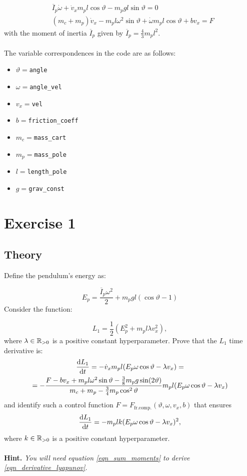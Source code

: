 \documentclass[12pt]{article}
\begin{document}
\begin{eqnarray}
\label{eqn_sum_moments}
& \overline{I}_p \dot{\omega} + \dot{v}_x m_p l\cos \vartheta  - m_p g l \sin \vartheta = 0 \\ 
\label{eqn_2nd_newton_law}
& (m_c + m_p) \dot{v}_x - m_p l \omega^2 \sin \vartheta + \dot{\omega} m_p l \cos \vartheta  + b v_x = F
\end{eqnarray}
with the moment of inertia $\overline{I}_p$ given by $\overline{I}_p  = \frac{4}{3}m_p l ^ 2 $.
\\
\\
The variable correspondences in the code are as follows:
\begin{itemize}
    \item $\vartheta=$\texttt{angle}
    \item $\omega=$\texttt{angle\_vel}
    \item $v_x=$\texttt{vel}
    \item $b=$\texttt{friction\_coeff} 
    \item $m_c=$\texttt{mass\_cart}
    \item $m_p=$\texttt{mass\_pole}
    \item $l=$\texttt{length\_pole}
    \item $g=$\texttt{grav\_const}
\end{itemize}
\section*{Exercise 1}
\subsection*{Theory}
Define the pendulum's energy as:

$$
E_p =  \frac{\overline{I}_p \omega ^ 2}{2}   + m_p g l (\cos{\vartheta} - 1)
$$
Consider the function:

\begin{equation}
    L_1 = \frac{1}{2}(E_p^2 + m_p l\lambda v_x ^ 2),
\end{equation}
where $\lambda \in {\mathbb{R}}_{> 0}$ is a positive constant hyperparameter. 
Prove that the $L_1$ time derivative is: 
\begin{multline}
\label{eqn_derivative_lyapunov}
\frac{\mathop{}\!\mathrm{d} L_1}{\mathop{}\!\mathrm{d} t} = - \dot{v}_x m_p l (E_p \omega \cos \vartheta - \lambda v_x) = \\ 
= -\frac{F - b v_x + m_p l \omega ^2 \sin{\vartheta} - \frac{3}{8}m_p g\sin(2\vartheta)}{m_c + m_p - \frac{3}{4} m_p \cos ^ 2 \vartheta} m_p l (E_p \omega \cos \vartheta - \lambda v_x)
\end{multline}
and identify such a control function $F = F_{\text{fr.comp.}}(\vartheta, \omega, v_x, b)$ that ensures 
$$
\frac{\mathop{}\!\mathrm{d} L_1}{\mathop{}\!\mathrm{d} t} = - m_p lk (E_p\omega \cos \vartheta  - \lambda v_x)^2,
$$
where $k\in {\mathbb{R}}_{> 0}$ is a positive constant hyperparameter.
\\
\\
\textbf{Hint.} \textit{You will need equation \eqref{eqn_sum_moments} to derive \eqref{eqn_derivative_lyapunov}.}
\end{document}
